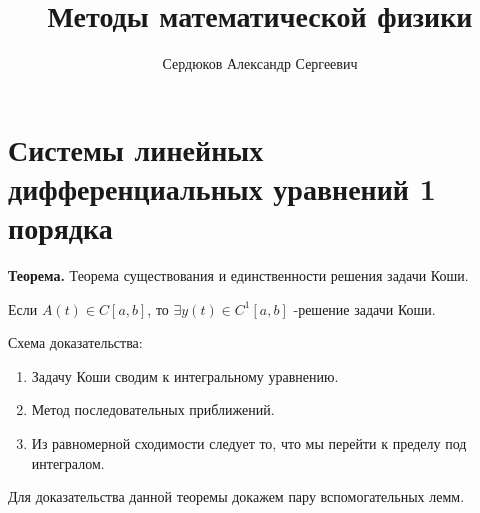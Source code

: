 \documentclass[12pt]{article}
\newcommand{\thr}{{\bfseries Теорема. }}
\begin{document}
	\title{Методы математической физики}
	\author{Сердюков Александр Сергеевич}
	\date{}
	\maketitle
	
	\section{Системы линейных дифференциальных уравнений 1 порядка}
	
	\thr Теорема существования и единственности решения задачи Коши.
	
	Если $A(t) \in C[a,b]$, то $\exists y(t) \in C^1[a,b] $ -решение задачи Коши.
	
	Схема доказательства:
	\begin{enumerate}
		\item Задачу Коши сводим к интегральному уравнению.
		\item Метод последовательных приближений.
		\item Из равномерной сходимости следует то, что мы перейти к пределу под интегралом.
	\end{enumerate}
	
	Для доказательства данной теоремы докажем пару вспомогательных лемм.	 
\end{document}
